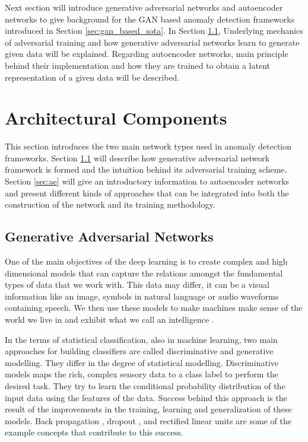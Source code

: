 Next section will introduce generative adversarial networks and autoencoder networks to give background for the 
GAN based anomaly detection frameworks introduced in Section \ref{sec:gan_based_sota}. In Section \ref{sec:gan}, Underlying mechanics of 
adversarial training and how generative adversarial networks learn to generate given data will be explained. Regarding 
autoencoder networks, main principle behind their implementation and how they are trained to obtain a latent representation of a given 
data will be described.


\section{Architectural Components}
\label{sec:arch_comp}
This section introduces the two main network types used in  anomaly detection
frameworks. Section \ref{sec:gan} will describe how generative adversarial network
framework is formed and the intuition behind its adversarial training scheme. Section 
\ref{sec:ae} will give an introductory information to autoencoder networks and present different kinds of
approaches that can be integrated into both the construction of the network and its training
methodology. 

\subsection{Generative Adversarial Networks}
\label{sec:gan}

One of the main objectives of the deep learning is to create complex and high dimensional
models that can capture the relations amongst the fundamental types of data that we work with. 
This data may differ, it can be a visual information like an image,
symbols in natural language or audio waveforms containing speech. We then use these models to make
machines make sense of the world we live in and exhibit what we call an intelligence
\cite{Bengio:2009:LDA:1658423.1658424}.

In the terms of statistical classification, also in machine learning, two main approaches for building 
classifiers are called discriminative and generative modelling. They differ in the degree of statistical 
modelling\cite{gdjabra}. Discriminative models maps the rich, complex sensory data to a class label to
perform the desired task. They try to learn the conditional probability distribution of the input
data using the features of the data. Success behind this approach is the result of the
improvements in the training, learning and generalization of these models. Back propagation
\cite{Widrow2008AppendixGT}, dropout \cite{Srivastava2014DropoutAS}, and rectified linear
units\cite{Glorot2011DeepSR} are some of the example concepts that contribute to this success.

